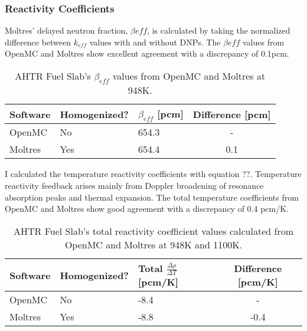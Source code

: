 \subsubsection{Reactivity Coefficients}
Moltres' delayed neutron fraction, $\beta{eff}$, is calculated by taking the 
normalized difference between $k_{eff}$ values with and without DNPs. 
The  $\beta{eff}$ values from OpenMC and Moltres show excellent 
agreement with a discrepancy of 0.1pcm. 
\begin{table}[H]
    \centering
    \onehalfspacing
    \caption{AHTR Fuel Slab's $\beta_{eff}$ values from OpenMC and Moltres at 948K.}
	\label{tab:betaeff_ahtr_moltres}
    \footnotesize
    \begin{tabular}{lllc}
    \hline 
    \textbf{Software}& \textbf{Homogenized?}& \textbf{$\beta_{eff}$ [pcm]} 
    & \textbf{Difference [pcm]}  \\
    \hline 
    OpenMC & No &  654.3 & - \\ 
    Moltres & Yes & 654.4 & 0.1\\ 
    \hline
    \end{tabular}
\end{table}
I calculated the temperature reactivity coefficients with equation ??. %
Temperature reactivity feedback arises mainly from Doppler broadening of 
resonance absorption peaks and thermal expansion.
The total temperature coefficients from OpenMC and Moltres show good 
agreement with a discrepancy of 0.4 pcm/K.
\begin{table}[H]
    \centering
    \onehalfspacing
    \caption{AHTR Fuel Slab's total reactivity coefficient values calculated from 
    OpenMC and Moltres at 948K and 1100K.}
	\label{tab:reactivity_ahtr_moltres}
    \footnotesize
    \begin{tabular}{lllc}
    \hline 
    \textbf{Software}& \textbf{Homogenized?}& \textbf{Total $\frac{\Delta \rho}{\Delta T}$ [pcm/K]} 
    & \textbf{Difference [pcm/K]}  \\
    \hline 
    OpenMC & No &  -8.4 & - \\ 
    Moltres & Yes & -8.8 & -0.4\\ 
    \hline
    \end{tabular}
\end{table}

